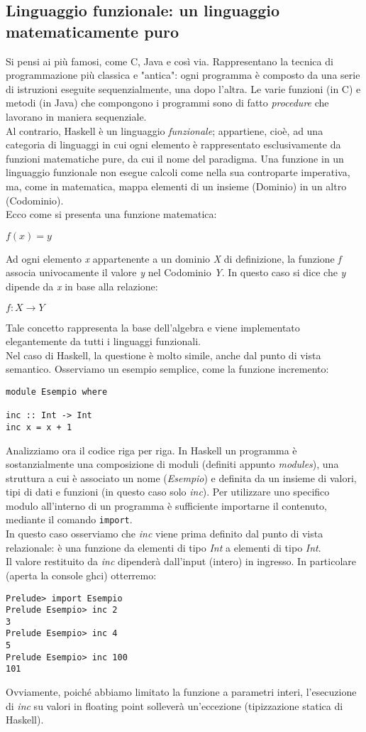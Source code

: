 \subsection{Linguaggio funzionale: un linguaggio matematicamente puro}
Si pensi ai più famosi, come C, Java e così via. Rappresentano la tecnica di programmazione più classica e "antica": ogni programma è composto da una serie di istruzioni eseguite sequenzialmente, una dopo l'altra. Le varie funzioni (in C) e metodi (in Java) che compongono i programmi sono di fatto \textit{procedure} che lavorano in maniera sequenziale.\\
Al contrario, Haskell è un linguaggio \textit{funzionale}; appartiene, cioè, ad una categoria di linguaggi  in cui ogni elemento è rappresentato esclusivamente da funzioni matematiche pure, da cui il nome del paradigma. Una funzione in un linguaggio funzionale non esegue calcoli come nella sua controparte imperativa, ma, come in matematica, mappa elementi di un insieme (Dominio) in un altro (Codominio).\\
Ecco come si presenta una funzione matematica:
\begin{center}
$f(x) = y$
\end{center}
Ad ogni elemento \textit{x} appartenente a un dominio \textit{X} di definizione, la funzione \textit{f} associa univocamente il valore \textit{y} nel Codominio \textit{Y}. In questo caso si dice che \textit{y} dipende da \textit{x} in base alla relazione:
\begin{center}
$f:X \to Y$
\end{center}
Tale concetto rappresenta la base dell'algebra e viene implementato elegantemente da tutti i linguaggi funzionali.\\
Nel caso di Haskell, la questione è molto simile, anche dal punto di vista semantico. Osserviamo un esempio semplice, come la funzione incremento:
\begin{verbatim}
module Esempio where

inc :: Int -> Int 
inc x = x + 1
\end{verbatim}
Analizziamo ora il codice riga per riga. In Haskell un programma è sostanzialmente una composizione di moduli (definiti appunto \textit{modules}), una struttura a cui è associato un nome (\textit{Esempio}) e definita da un insieme di valori, tipi di dati e funzioni (in questo caso solo \textit{inc}). Per utilizzare uno specifico modulo all'interno di un programma è sufficiente importarne il contenuto, mediante il comando \texttt{import}.\\
In questo caso osserviamo che \textit{inc} viene prima definito dal punto di vista relazionale: è una funzione da elementi di tipo \textit{Int} a elementi di tipo \textit{Int}.\\
Il valore restituito da \textit{inc} dipenderà dall'input (intero) in ingresso. In particolare (aperta la console ghci) otterremo:
\begin{verbatim}
Prelude> import Esempio
Prelude Esempio> inc 2
3
Prelude Esempio> inc 4
5
Prelude Esempio> inc 100
101
\end{verbatim}
Ovviamente, poiché abbiamo limitato la funzione a parametri interi, l'esecuzione di \textit{inc} su valori in floating point solleverà un'eccezione (tipizzazione statica di Haskell).

